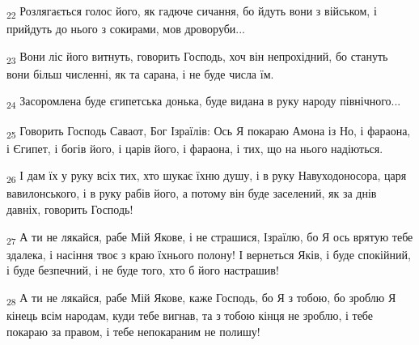 \begin{tcolorbox}
\textsubscript{22} Розлягається голос його, як гадюче сичання, бо йдуть вони з військом, і прийдуть до нього з сокирами, мов дроворуби...
\end{tcolorbox}
\begin{tcolorbox}
\textsubscript{23} Вони ліс його витнуть, говорить Господь, хоч він непрохідний, бо стануть вони більш численні, як та сарана, і не буде числа їм.
\end{tcolorbox}
\begin{tcolorbox}
\textsubscript{24} Засоромлена буде єгипетська донька, буде видана в руку народу північного...
\end{tcolorbox}
\begin{tcolorbox}
\textsubscript{25} Говорить Господь Саваот, Бог Ізраїлів: Ось Я покараю Амона із Но, і фараона, і Єгипет, і богів його, і царів його, і фараона, і тих, що на нього надіються.
\end{tcolorbox}
\begin{tcolorbox}
\textsubscript{26} І дам їх у руку всіх тих, хто шукає їхню душу, і в руку Навуходоносора, царя вавилонського, і в руку рабів його, а потому він буде заселений, як за днів давніх, говорить Господь!
\end{tcolorbox}
\begin{tcolorbox}
\textsubscript{27} А ти не лякайся, рабе Мій Якове, і не страшися, Ізраїлю, бо Я ось врятую тебе здалека, і насіння твоє з краю їхнього полону! І вернеться Яків, і буде спокійний, і буде безпечний, і не буде того, хто б його настрашив!
\end{tcolorbox}
\begin{tcolorbox}
\textsubscript{28} А ти не лякайся, рабе Мій Якове, каже Господь, бо Я з тобою, бо зроблю Я кінець всім народам, куди тебе вигнав, та з тобою кінця не зроблю, і тебе покараю за правом, і тебе непокараним не полишу!
\end{tcolorbox}
